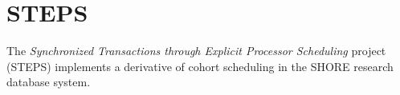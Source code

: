 \documentclass[12pt,a4paper]{book}
\begin{document}
\section{STEPS}\label{ch:relwork:steps}

The \emph{Synchronized Transactions through Explicit Processor Scheduling} project (STEPS) implements a derivative of cohort scheduling in the SHORE research database system.~\cite{shore}
\end{document}
